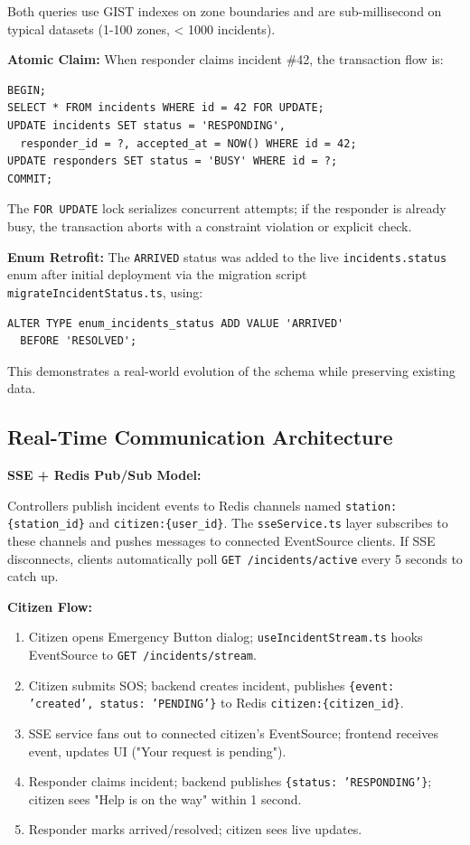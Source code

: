Both queries use GIST indexes on zone boundaries and are sub-millisecond on typical datasets (1-100 zones, < 1000 incidents).

\textbf{Atomic Claim:} When responder claims incident \#42, the transaction flow is:
\begin{verbatim}
BEGIN;
SELECT * FROM incidents WHERE id = 42 FOR UPDATE;
UPDATE incidents SET status = 'RESPONDING',
  responder_id = ?, accepted_at = NOW() WHERE id = 42;
UPDATE responders SET status = 'BUSY' WHERE id = ?;
COMMIT;
\end{verbatim}

The \texttt{FOR UPDATE} lock serializes concurrent attempts; if the responder is already busy, the transaction aborts with a constraint violation or explicit check.

\textbf{Enum Retrofit:} The \texttt{ARRIVED} status was added to the live \texttt{incidents.status} enum after initial deployment via the migration script \texttt{migrateIncidentStatus.ts}, using:
\begin{verbatim}
ALTER TYPE enum_incidents_status ADD VALUE 'ARRIVED'
  BEFORE 'RESOLVED';
\end{verbatim}

This demonstrates a real-world evolution of the schema while preserving existing data.

\subsection{Real-Time Communication Architecture}

\textbf{SSE + Redis Pub/Sub Model:}

Controllers publish incident events to Redis channels named \texttt{station:\{station\_id\}} and \texttt{citizen:\{user\_id\}}. The \texttt{sseService.ts} layer subscribes to these channels and pushes messages to connected EventSource clients. If SSE disconnects, clients automatically poll \texttt{GET /incidents/active} every 5 seconds to catch up.

\textbf{Citizen Flow:}
\begin{enumerate}
  \item Citizen opens Emergency Button dialog; \texttt{useIncidentStream.ts} hooks EventSource to \texttt{GET /incidents/stream}.
  \item Citizen submits SOS; backend creates incident, publishes \texttt{\{event: 'created', status: 'PENDING'\}} to Redis \texttt{citizen:\{citizen\_id\}}.
  \item SSE service fans out to connected citizen's EventSource; frontend receives event, updates UI ("Your request is pending").
  \item Responder claims incident; backend publishes \texttt{\{status: 'RESPONDING'\}}; citizen sees "Help is on the way" within 1 second.
  \item Responder marks arrived/resolved; citizen sees live updates.
\end{enumerate}

